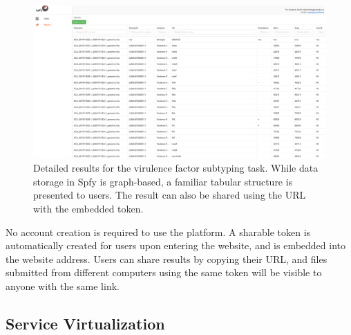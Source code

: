 \documentclass{article}
\begin{document}
\begin{figure}[!hb]
\begin{center}
\includegraphics[width=\textwidth]{images/tables.png}
\end{center}
\caption{Detailed results for the virulence factor subtyping task. While data storage in Spfy is graph-based, a familiar tabular structure is presented to users. The result can also be shared using the URL with the embedded token.}
\label{fig-tables}
\end{figure}

No account creation is required to use the platform. A sharable token is automatically created for users upon entering the website, and is embedded into the website address. Users can share results by copying their URL, and files submitted from different computers using the same token will be visible to anyone with the same link.

\subsection{Service Virtualization}


\end{document}

